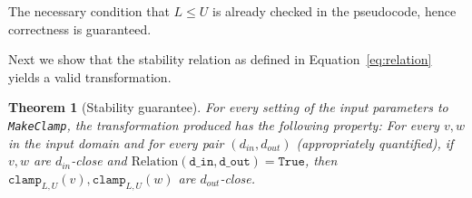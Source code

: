 \documentclass[11pt,a4paper]{article}
\newtheorem{theorem}{Theorem}
\newtheorem{lemma}{Lemma}
\theoremstyle{definition}
\newcommand{\din}{\texttt{d\_in}}
\newcommand{\dout}{\texttt{d\_out}}
\newcommand{\Relation}{\mathrm{Relation}}
\newcommand{\X}{\mathcal{X}}
\newcommand{\Y}{\mathcal{Y}}
\newcommand{\True}{\texttt{True}}
\newcommand{\False}{\texttt{False}}
\newcommand{\clamp}{\texttt{clamp}}
\newcommand{\silvia}[1]{{ {\color{blue}{(silvia)~#1}}}}
\newcommand{\grace}[1]{{ {\color{purple}{(grace)~#1}}}}
\begin{document}

The necessary condition that $L \leq U$ is already checked in the pseudocode, hence correctness is guaranteed. 

\medskip

Next we show that the stability relation as defined in Equation~\eqref{eq:relation} yields a valid transformation. %



        

\begin{theorem}[Stability guarantee]
    For every setting of the input parameters to \texttt{MakeClamp}, the transformation produced
    has the following property:
    For every $v,w$ in the input domain and for every pair $(d_{in}, d_{out})$ (appropriately quantified), if 
    $v,w$ are $d_{in}$-close and $\Relation(\din, \dout) = \True$, then $\clamp_{L, U}(v), \clamp_{L, U}(w)$ are $d_{out}$-close. %
\end{theorem} %
\end{document}
